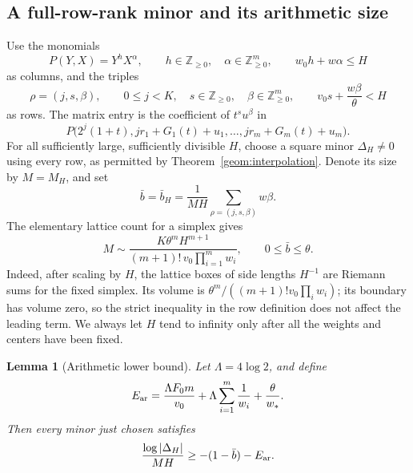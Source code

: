 \documentclass[11pt]{article}
\newcommand{\ZZ}{\mathbb Z}
\newtheorem{lemma}[theorem]{Lemma}
\theoremstyle{definition}
\theoremstyle{remark}
\numberwithin{equation}{section}
\begin{document}
\subsection{A full-row-rank minor and its arithmetic size}

Use the monomials
\[
 P(Y,X)=Y^hX^\alpha,
 \qquad h\in\ZZ_{\ge0},\quad \alpha\in\ZZ_{\ge0}^m,
 \qquad w_0h+w\alpha\le H
\]
as columns, and the triples
\[
 \rho=(j,s,\beta),\qquad
 0\le j<K,\quad s\in\ZZ_{\ge0},\quad\beta\in\ZZ_{\ge0}^m,
 \qquad v_0s+\frac{w\beta}{\theta}<H
\]
as rows.  The matrix entry is the coefficient of $t^su^\beta$ in
\begin{equation}
 P\bigl(2^j(1+t),jr_1+G_1(t)+u_1,\ldots,jr_m+G_m(t)+u_m\bigr).
 \label{det:matrix}
\end{equation}
For all sufficiently large, sufficiently divisible $H$, choose a square
minor $\Delta_H\ne0$ using every row, as permitted by
Theorem~\ref{geom:interpolation}.  Denote its size by $M=M_H$, and set
\begin{equation}
 \bar b=\bar b_H=\frac{1}{MH}\sum_{\rho=(j,s,\beta)}w\beta.
 \label{det:bbar}
\end{equation}
The elementary lattice count for a simplex gives
\begin{equation}
 M\sim
 \frac{K\theta^mH^{m+1}}{(m+1)!\,v_0\prod_{i=1}^m w_i},
 \qquad 0\le\bar b\le\theta.
 \label{det:row-count}
\end{equation}
Indeed, after scaling by $H$, the lattice boxes of side lengths $H^{-1}$
are Riemann sums for the fixed simplex.  Its volume is
$\theta^m/((m+1)!v_0\prod_iw_i)$; its boundary has volume zero, so the
strict inequality in the row definition does not affect the leading
term.  We always let $H$ tend to infinity only after all the weights and
centers have been fixed.

\begin{lemma}[Arithmetic lower bound]\label{det:arithmetic}
Let $\Lambda=4\log2$, and define
\begin{equation}
 E_{\rm ar}
 =\frac{\Lambda F_0m}{v_0}
  +\Lambda\sum_{i=1}^m\frac1{w_i}+\frac{\theta}{w_*}.
 \label{det:arith-error}
\end{equation}
Then every minor just chosen satisfies
\begin{equation}
 \frac{\log|\Delta_H|}{MH}
 \ge -(1-\bar b)-E_{\rm ar}.
 \label{det:lower}
\end{equation}
\end{lemma}
\end{document}

